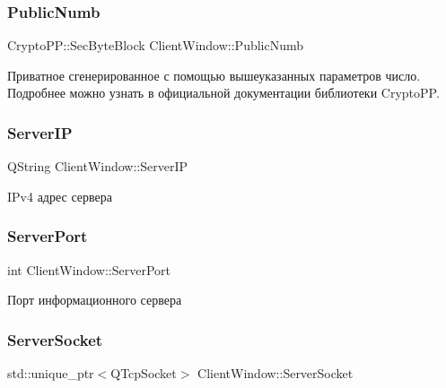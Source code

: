 \subsubsection{\texorpdfstring{Public\+Numb}{PublicNumb}}
{\footnotesize\ttfamily Crypto\+P\+P\+::\+Sec\+Byte\+Block Client\+Window\+::\+Public\+Numb\hspace{0.3cm}{\ttfamily [private]}}



Приватное сгенерированное с помощью вышеуказанных параметров число. Подробнее можно узнать в официальной документации библиотеки Crypto\+PP. 

\mbox{\label{class_client_window_abaec733868dc94910f89011513ab4c7b}} 
\subsubsection{\texorpdfstring{Server\+IP}{ServerIP}}
{\footnotesize\ttfamily Q\+String Client\+Window\+::\+Server\+IP\hspace{0.3cm}{\ttfamily [private]}}



I\+Pv4 адрес сервера 

\mbox{\label{class_client_window_a3f0c47409cc45b690b52ecf177a86adb}} 
\subsubsection{\texorpdfstring{Server\+Port}{ServerPort}}
{\footnotesize\ttfamily int Client\+Window\+::\+Server\+Port\hspace{0.3cm}{\ttfamily [private]}}



Порт информационного сервера 

\mbox{\label{class_client_window_a74e7b0eb499506ff2071e314cdab83dc}} 
\subsubsection{\texorpdfstring{Server\+Socket}{ServerSocket}}
{\footnotesize\ttfamily std\+::unique\+\_\+ptr$<$Q\+Tcp\+Socket$>$ Client\+Window\+::\+Server\+Socket\hspace{0.3cm}{\ttfamily [private]}}



